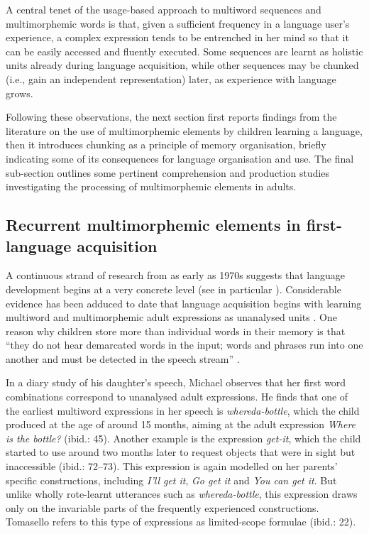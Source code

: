 A central tenet of the usage-based approach to multiword sequences and multimorphemic words is that, given a sufficient frequency in a language user's experience, a complex expression tends to be entrenched in her mind so that it can be easily accessed and fluently executed. Some sequences are learnt as holistic units already during  language acquisition, while other sequences may be chunked (i.e., gain an independent representation) later, as experience with language grows. 

Following these observations, the next section first reports findings from the literature on the use of multimorphemic elements by children learning a language, then it introduces chunking as a principle of memory organisation, briefly indicating some of its consequences for language organisation and use. The final sub-section outlines some pertinent comprehension and production studies investigating the processing of multimorphemic elements in adults. 

\subsection{Recurrent multimorphemic elements in first-language acquisition}
A continuous strand of research from as early as 1970s suggests that language development begins at a very concrete level (see in particular \citealt{bowerman-1973,clark-1974,braine-1976,tomasello-1992,pine-lieven-1993,dabrowska-lieven-2005}). Considerable evidence has been adduced to date that language acquisition begins with learning multiword and multimorphemic adult expressions as unanalysed units \citep{lieven-pine-baldwin-1997,dabrowska-2004,bannard-matthews-2008,lieven-salomo-tomasello-2009,arnon-clark-2011}. One reason why children store more than individual words in their memory is that ``they do not hear demarcated words in the input; words and phrases run into one another and must be detected in the speech stream'' \citep[][241]{bannard-matthews-2008}.

In a diary study of his daughter's speech, Michael \citet{tomasello-1992} observes that her first word combinations correspond to unanalysed adult expressions. He finds that one of the earliest multiword expressions in her speech is \textit{whereda-bottle}, which the child produced at the age of around 15 months, aiming at the adult expression \textit{Where is the bottle?} (ibid.: 45). Another example is the expression \textit{get-it}, which the child started to use around two months later to request objects that were in sight but inaccessible (ibid.: 72--73). This expression is again modelled on her parents' specific constructions, including \textit{I'll get it}, \textit{Go get it} and \textit{You can get it}. But unlike wholly rote-learnt utterances such as \textit{whereda-bottle}, this expression draws only on the invariable parts of the frequently experienced constructions. Tomasello refers to this type of expressions as limited-scope formulae (ibid.: 22).


